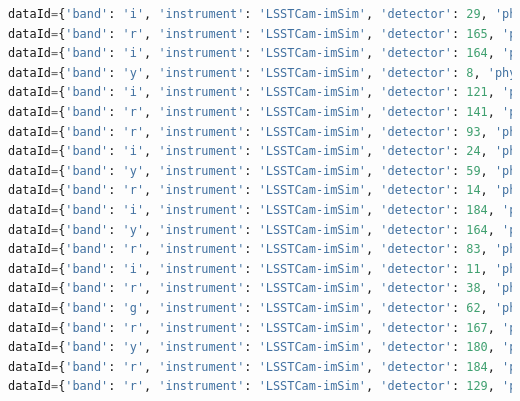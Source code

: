 \documentclass[DM,authoryear,toc]{lsstdoc}
\begin{document}
\begin{lstlisting}[language=Python, basicstyle=\tiny]
dataId={'band': 'i', 'instrument': 'LSSTCam-imSim', 'detector': 29, 'physical_filter': 'i_sim_1.4', 'visit': 1029810} records=None
dataId={'band': 'r', 'instrument': 'LSSTCam-imSim', 'detector': 165, 'physical_filter': 'r_sim_1.4', 'visit': 638950} records=None
dataId={'band': 'i', 'instrument': 'LSSTCam-imSim', 'detector': 164, 'physical_filter': 'i_sim_1.4', 'visit': 1030665} records=None
dataId={'band': 'y', 'instrument': 'LSSTCam-imSim', 'detector': 8, 'physical_filter': 'y_sim_1.4', 'visit': 1032264} records=None
dataId={'band': 'i', 'instrument': 'LSSTCam-imSim', 'detector': 121, 'physical_filter': 'i_sim_1.4', 'visit': 645623} records=None
dataId={'band': 'r', 'instrument': 'LSSTCam-imSim', 'detector': 141, 'physical_filter': 'r_sim_1.4', 'visit': 1052890} records=None
dataId={'band': 'r', 'instrument': 'LSSTCam-imSim', 'detector': 93, 'physical_filter': 'r_sim_1.4', 'visit': 1052890} records=None
dataId={'band': 'i', 'instrument': 'LSSTCam-imSim', 'detector': 24, 'physical_filter': 'i_sim_1.4', 'visit': 1030664} records=None
dataId={'band': 'y', 'instrument': 'LSSTCam-imSim', 'detector': 59, 'physical_filter': 'y_sim_1.4', 'visit': 1033987} records=None
dataId={'band': 'r', 'instrument': 'LSSTCam-imSim', 'detector': 14, 'physical_filter': 'r_sim_1.4', 'visit': 1006099} records=None
dataId={'band': 'i', 'instrument': 'LSSTCam-imSim', 'detector': 184, 'physical_filter': 'i_sim_1.4', 'visit': 1030666} records=None
dataId={'band': 'y', 'instrument': 'LSSTCam-imSim', 'detector': 164, 'physical_filter': 'y_sim_1.4', 'visit': 1056411} records=None
dataId={'band': 'r', 'instrument': 'LSSTCam-imSim', 'detector': 83, 'physical_filter': 'r_sim_1.4', 'visit': 1052890} records=None
dataId={'band': 'i', 'instrument': 'LSSTCam-imSim', 'detector': 11, 'physical_filter': 'i_sim_1.4', 'visit': 1029805} records=None
dataId={'band': 'r', 'instrument': 'LSSTCam-imSim', 'detector': 38, 'physical_filter': 'r_sim_1.4', 'visit': 1052890} records=None
dataId={'band': 'g', 'instrument': 'LSSTCam-imSim', 'detector': 62, 'physical_filter': 'g_sim_1.4', 'visit': 1039916} records=None
dataId={'band': 'r', 'instrument': 'LSSTCam-imSim', 'detector': 167, 'physical_filter': 'r_sim_1.4', 'visit': 1038217} records=None
dataId={'band': 'y', 'instrument': 'LSSTCam-imSim', 'detector': 180, 'physical_filter': 'y_sim_1.4', 'visit': 1033109} records=None
dataId={'band': 'r', 'instrument': 'LSSTCam-imSim', 'detector': 184, 'physical_filter': 'r_sim_1.4', 'visit': 1006059} records=None
dataId={'band': 'r', 'instrument': 'LSSTCam-imSim', 'detector': 129, 'physical_filter': 'r_sim_1.4', 'visit': 1006007} records=None

\end{lstlisting}
\end{document}
